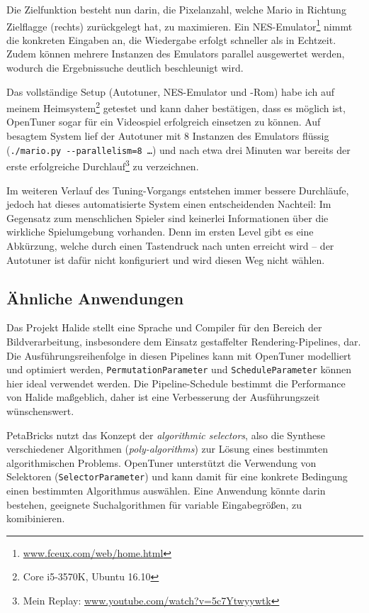\documentclass[a4paper,11pt]{scrartcl}
\begin{document}
Die Zielfunktion besteht nun darin, die Pixelanzahl, welche Mario in Richtung Zielflagge (rechts)
zurückgelegt hat, zu maximieren. Ein NES-Emulator\footnote{\url{www.fceux.com/web/home.html}}
nimmt die konkreten Eingaben an, die Wiedergabe erfolgt schneller als in Echtzeit. Zudem können
mehrere Instanzen des Emulators parallel ausgewertet werden, wodurch die Ergebnissuche 
deutlich beschleunigt wird. \newline

Das vollständige Setup (Autotuner, NES-Emulator und -Rom) habe ich auf meinem 
Heimsystem\footnote{Core i5-3570K, Ubuntu 16.10} getestet und kann daher 
bestätigen, dass es möglich ist, OpenTuner sogar für ein Videospiel erfolgreich
einsetzen zu können. Auf besagtem System lief der Autotuner mit 8 Instanzen des
Emulators flüssig (\texttt{./mario.py -{}-parallelism=8 \ldots}) und nach etwa drei Minuten
war bereits der erste erfolgreiche Durchlauf\footnote{Mein Replay: \url{www.youtube.com/watch?v=5c7Ytwyywtk}} zu verzeichnen. \newline

Im weiteren Verlauf des Tuning-Vorgangs entstehen immer bessere Durchläufe, jedoch
hat dieses automatisierte System einen entscheidenden Nachteil: Im Gegensatz zum menschlichen
Spieler sind keinerlei Informationen über die wirkliche Spielumgebung vorhanden.
Denn im ersten Level gibt es eine Abkürzung, welche durch einen Tastendruck nach 
unten erreicht wird -- der Autotuner ist dafür nicht konfiguriert und wird diesen Weg
nicht wählen.


\subsection{Ähnliche Anwendungen}
Das Projekt Halide \cite{halide} stellt eine Sprache und Compiler für den Bereich der 
Bildverarbeitung, insbesondere dem Einsatz gestaffelter Rendering-Pipelines, dar.
Die Ausführungsreihenfolge in diesen Pipelines kann mit OpenTuner modelliert und 
optimiert werden, \texttt{PermutationParameter} und \texttt{ScheduleParameter}
können hier ideal verwendet werden. Die Pipeline-Schedule bestimmt die Performance
von Halide maßgeblich, daher ist eine Verbesserung der Ausführungszeit wünschenswert. \newline

PetaBricks \cite{petab} nutzt das Konzept der \emph{algorithmic selectors}, also die 
Synthese verschiedener Algorithmen (\emph{poly-algorithms}) zur Lösung eines bestimmten algorithmischen Problems.
OpenTuner unterstützt die Verwendung von Selektoren (\texttt{SelectorParameter})
und kann damit für eine konkrete Bedingung einen bestimmten Algorithmus auswählen. 
Eine Anwendung könnte darin bestehen, geeignete Suchalgorithmen für variable
Eingabegrößen, zu komibinieren.
\end{document}
